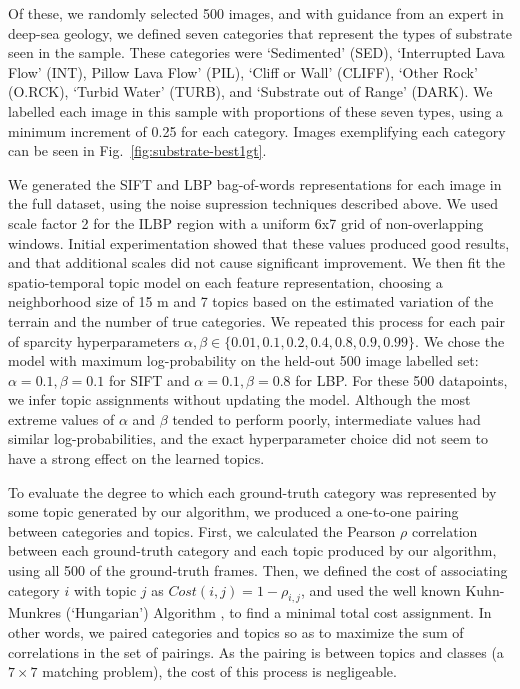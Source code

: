 Of these, we randomly selected 500 images, and with guidance from an expert in deep-sea geology, we defined seven categories that represent the types of substrate seen in the sample. These categories were ‘Sedimented’ (SED), ‘Interrupted Lava Flow’ (INT), Pillow Lava Flow’ (PIL), ‘Cliff or Wall’ (CLIFF), ‘Other Rock’ (O.RCK), ‘Turbid Water’ (TURB), and ‘Substrate out of Range’ (DARK). We labelled each image in this sample with proportions of these seven types, using a minimum increment of 0.25 for each category. Images exemplifying each category can be seen in Fig.~\ref{fig:substrate-best1gt}.

We generated the SIFT and LBP bag-of-words representations for each image in the full dataset, using the noise supression techniques described above. We used scale factor 2 for the ILBP region with a uniform 6x7 grid of non-overlapping windows. Initial experimentation showed that these values produced good results, and that additional scales did not cause significant improvement. We then fit the spatio-temporal topic model on each feature representation, choosing a neighborhood size of 15 m and 7 topics based on the estimated variation of the terrain and the number of true categories. We repeated this process for each pair of sparcity hyperparameters $\alpha, \beta \in \{0.01, 0.1, 0.2, 0.4, 0.8, 0.9, 0.99\}$. We chose the model with maximum log-probability on the held-out 500 image labelled set: $\alpha = 0.1, \beta = 0.1$ for SIFT and $\alpha = 0.1, \beta = 0.8$ for LBP. For these 500 datapoints, we infer topic assignments without updating the model. Although the most extreme values of $\alpha$ and $\beta$ tended to perform poorly, intermediate values had similar log-probabilities, and the exact hyperparameter choice did not seem to have a strong effect on the learned topics.

To evaluate the degree to which each ground-truth category was represented by some topic generated by our algorithm, we produced a one-to-one pairing between categories and topics. First, we calculated the Pearson $\rho$ correlation between each ground-truth category and each topic produced by our algorithm, using all 500 of the ground-truth frames. Then, we defined the cost of associating category $i$ with topic $j$ as $Cost(i, j) = 1 - \rho_{i,j}$, and used the well known Kuhn-Munkres (`Hungarian') Algorithm \citep{KuhnHungarian}, to find a minimal total cost assignment. In other words, we paired categories and topics so as to maximize the sum of correlations in the set of pairings. As the pairing is between topics and classes (a $7\times7$ matching problem), the cost of this process is negligeable.


